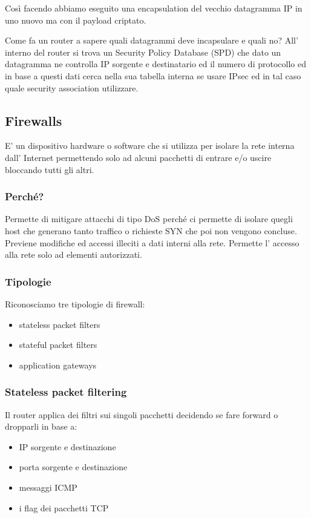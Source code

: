 Così facendo abbiamo eseguito una encapsulation del vecchio datagramma IP in uno nuovo ma con il payload criptato.

Come fa un router a sapere quali datagrammi deve incapsulare e quali no?
All' interno del router si trova un Security Policy Database (SPD) che dato un datagramma ne controlla IP sorgente e destinatario ed il numero di protocollo ed in base a questi dati cerca nella sua tabella interna se usare IPsec ed in tal caso quale security association utilizzare.

\subsection{Firewalls}
E' un dispositivo hardware o software che si utilizza per isolare la rete interna dall' Internet permettendo solo ad alcuni pacchetti di entrare e/o uscire bloccando tutti gli altri.

\subsubsection{Perché?}
Permette di mitigare attacchi di tipo DoS perché ci permette di isolare quegli host che generano tanto traffico o richieste SYN che poi non vengono concluse.
Previene modifiche ed accessi illeciti a dati interni alla rete.
Permette l' accesso alla rete solo ad elementi autorizzati.

\subsubsection{Tipologie}
Riconosciamo tre tipologie di firewall:
\begin{itemize}
    \item stateless packet filters
    \item stateful packet filters
    \item application gateways
\end{itemize}

\subsubsection{Stateless packet filtering}
Il router applica dei filtri sui singoli pacchetti decidendo se fare forward o dropparli in base a:
\begin{itemize}
    \item IP sorgente e destinazione
    \item porta sorgente e destinazione
    \item messaggi ICMP
    \item i flag dei pacchetti TCP
\end{itemize}

